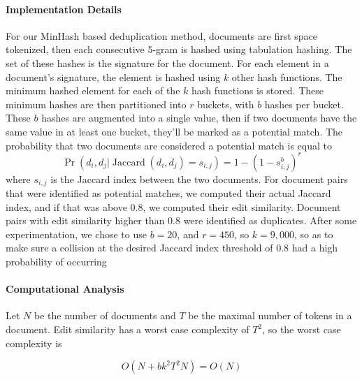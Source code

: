 \paragraph{Implementation Details}
\label{section:minhash_details}
For our MinHash based deduplication method, documents are first space tokenized, then each consecutive 5-gram is hashed using tabulation hashing.
The set of these hashes is the signature for the document.
For each element in a document's signature, the element is hashed using $k$ other hash functions.
The minimum hashed element for each of the $k$ hash functions is stored.
These minimum hashes are then partitioned into $r$ buckets, with $b$ hashes per bucket.
These $b$ hashes are augmented into a single value, then if two documents have the same value in at least one bucket, they'll be marked as a potential match.
The probability that two documents are considered a potential match is equal to
\begin{equation}
\operatorname{Pr}(d_i, d_j | \operatorname{Jaccard}(d_i, d_j) = s_{i, j}) = 1 - (1 - s_{i, j}^b)^r
\end{equation}
where $s_{i,j}$ is the Jaccard index between the two documents.
For document pairs that were identified as potential matches, we computed their actual Jaccard index, and if that was above 0.8, we computed their edit similarity.
Document pairs with edit similarity higher than 0.8 were identified as duplicates.
After some experimentation, we chose to use $b=20$, and $r=450$, so $k=9,000$, so as to make sure a collision at the desired Jaccard index threshold of 0.8 had a high probability of occurring

\paragraph{Computational Analysis}

Let $N$ be the number of documents and $T$ be the maximal number of tokens in a document. Edit similarity has a worst case complexity of $T^2$, so the worst case complexity is

\begin{equation}
    O(N + b k^{2} T^{2} N) = O(N)
\end{equation}


